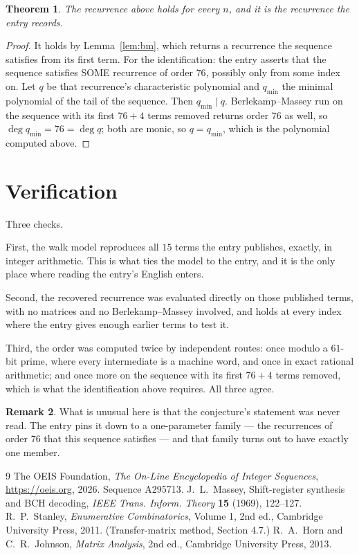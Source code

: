\documentclass[11pt,a4paper]{article}
\theoremstyle{plain}
\newtheorem{theorem}{Theorem}
\theoremstyle{definition}
\newtheorem{remark}[theorem]{Remark}
\begin{document}
\begin{theorem}
The recurrence above holds for every $n$, and it is the recurrence the entry records.
\end{theorem}

\begin{proof}
It holds by Lemma~\ref{lem:bm}, which returns a recurrence the sequence satisfies from its
first term. For the identification: the entry asserts that the sequence satisfies SOME
recurrence of order $76$, possibly only from some index on. Let $q$ be that recurrence's
characteristic polynomial and $q_{\min}$ the minimal polynomial of the tail of the sequence.
Then $q_{\min}\mid q$. Berlekamp--Massey run on the sequence with its first $76+4$ terms
removed returns order $76$ as well, so $\deg q_{\min}=76=\deg q$; both are monic, so
$q=q_{\min}$, which is the polynomial computed above.
\end{proof}

\section{Verification}

Three checks.

First, the walk model reproduces all $15$ terms the entry publishes, exactly, in integer
arithmetic. This is what ties the model to the entry, and it is the only place where reading
the entry's English enters.

Second, the recovered recurrence was evaluated directly on those published terms, with no
matrices and no Berlekamp--Massey involved, and holds at every index where the entry gives
enough earlier terms to test it.

Third, the order was computed twice by independent routes: once modulo a $61$-bit prime, where
every intermediate is a machine word, and once in exact rational arithmetic; and once more on
the sequence with its first $76+4$ terms removed, which is what the identification above
requires. All three agree.

\begin{remark}
What is unusual here is that the conjecture's statement was never read. The entry pins it down
to a one-parameter family --- the recurrences of order $76$ that this sequence satisfies
--- and that family turns out to have exactly one member.
\end{remark}

\begin{thebibliography}{9}
 The OEIS Foundation, \emph{The On-Line Encyclopedia of Integer
Sequences}, \url{https://oeis.org}, 2026. Sequence A295713.
 J.~L.~Massey, Shift-register synthesis and BCH decoding, \emph{IEEE
Trans. Inform. Theory} \textbf{15} (1969), 122--127.
 R.~P.~Stanley, \emph{Enumerative Combinatorics}, Volume 1, 2nd ed.,
Cambridge University Press, 2011. (Transfer-matrix method, Section 4.7.)
 R.~A.~Horn and C.~R.~Johnson, \emph{Matrix Analysis}, 2nd ed., Cambridge
University Press, 2013.
\end{thebibliography}
\end{document}
